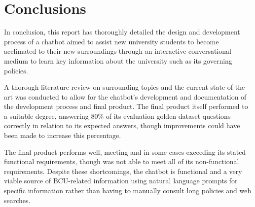 \chapter{Conclusions}

In conclusion, this report has thoroughly detailed the design and development process of a chatbot aimed to assist new university students 
to become acclimated to their new surroundings through an interactive conversational medium to learn key information about the university 
such as its governing policies.

\para A thorough literature review on surrounding topics and the current state-of-the-art was conducted to allow for the chatbot's development
and documentation of the development process and final product. The final product itself performed to a suitable degree, answering 80\% of its 
evaluation golden dataset questions correctly in relation to its expected answers, though improvements could have been made to increase this 
percentage.

\para The final product performs well, meeting and in some cases exceeding its stated functional requirements, though was not 
able to meet all of its non-functional requirements. Despite these shortcomings, the chatbot is functional and a very viable source of BCU-related 
information using natural language prompts for specific information rather than having to manually consult long policies and web searches. 


\nocite{projectGithub} %